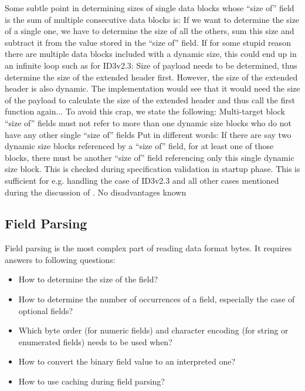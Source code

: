 Some subtle point in determining sizes of single data blocks whose ``size of'' field is the sum of multiple consecutive data blocks is: If we want to determine the size of a single one, we have to determine the size of all the others, sum this size and subtract it from the value stored in the ``size of'' field. If for some stupid reason there are multiple data blocks included with a dynamic size, this could end up in an infinite loop such as for ID3v2.3: Size of payload needs to be determined, thus determine the size of the extended header first. However, the size of the extended header is also dynamic. The implementation would see that it would need the size of the payload to calculate the size of the extended header and thus call the first function again... To avoid this crap, we state the following:
{%
Multi-target block ``size of'' fields must not refer to more than one dynamic size blocks who do not have any other single ``size of'' fields  
}
{%
Put in different words: If there are say two dynamic size blocks referenced by a ``size of'' field, for at least one of those blocks, there must be another ``size of'' field referencing only this single dynamic size block. This is checked during specification validation in startup phase. 
}
{%
This is sufficient for e.g. handling the case of ID3v2.3 and all other cases mentioned during the discussion of .
}
{%
No disadvantages known
}


\subsection{Field Parsing}%
\label{sec:FieldParsing}%

Field parsing is the most complex part of reading data format bytes. It requires answers to following questions:
\begin{itemize}
\item How to determine the size of the field?
\item How to determine the number of occurrences of a field, especially the case of optional fields?
\item Which byte order (for numeric fields) and character encoding (for string or enumerated fields) needs to be used when?
\item How to convert the binary field value to an interpreted one?
\item How to use caching during field parsing?
\end{itemize}

